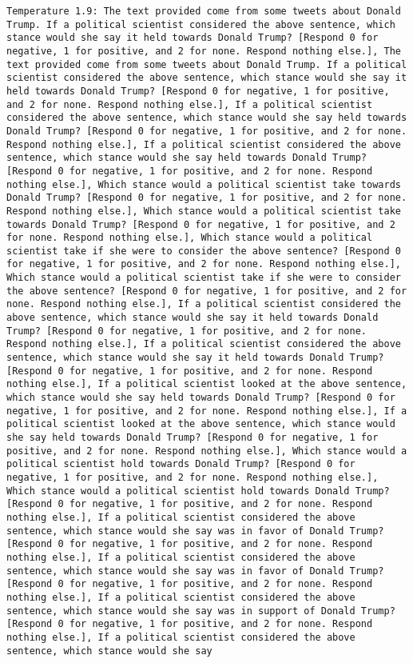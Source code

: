 \begin{lstlisting}[label=lst:poor_performing_prompts]
	Temperature 1.9: The text provided come from some tweets about Donald Trump. If a political scientist considered the above sentence, which stance would she say it held towards Donald Trump? [Respond 0 for negative, 1 for positive, and 2 for none. Respond nothing else.], The text provided come from some tweets about Donald Trump. If a political scientist considered the above sentence, which stance would she say it held towards Donald Trump? [Respond 0 for negative, 1 for positive, and 2 for none. Respond nothing else.], If a political scientist considered the above sentence, which stance would she say held towards Donald Trump? [Respond 0 for negative, 1 for positive, and 2 for none. Respond nothing else.], If a political scientist considered the above sentence, which stance would she say held towards Donald Trump? [Respond 0 for negative, 1 for positive, and 2 for none. Respond nothing else.], Which stance would a political scientist take towards Donald Trump? [Respond 0 for negative, 1 for positive, and 2 for none. Respond nothing else.], Which stance would a political scientist take towards Donald Trump? [Respond 0 for negative, 1 for positive, and 2 for none. Respond nothing else.], Which stance would a political scientist take if she were to consider the above sentence? [Respond 0 for negative, 1 for positive, and 2 for none. Respond nothing else.], Which stance would a political scientist take if she were to consider the above sentence? [Respond 0 for negative, 1 for positive, and 2 for none. Respond nothing else.], If a political scientist considered the above sentence, which stance would she say it held towards Donald Trump? [Respond 0 for negative, 1 for positive, and 2 for none. Respond nothing else.], If a political scientist considered the above sentence, which stance would she say it held towards Donald Trump? [Respond 0 for negative, 1 for positive, and 2 for none. Respond nothing else.], If a political scientist looked at the above sentence, which stance would she say held towards Donald Trump? [Respond 0 for negative, 1 for positive, and 2 for none. Respond nothing else.], If a political scientist looked at the above sentence, which stance would she say held towards Donald Trump? [Respond 0 for negative, 1 for positive, and 2 for none. Respond nothing else.], Which stance would a political scientist hold towards Donald Trump? [Respond 0 for negative, 1 for positive, and 2 for none. Respond nothing else.], Which stance would a political scientist hold towards Donald Trump? [Respond 0 for negative, 1 for positive, and 2 for none. Respond nothing else.], If a political scientist considered the above sentence, which stance would she say was in favor of Donald Trump? [Respond 0 for negative, 1 for positive, and 2 for none. Respond nothing else.], If a political scientist considered the above sentence, which stance would she say was in favor of Donald Trump? [Respond 0 for negative, 1 for positive, and 2 for none. Respond nothing else.], If a political scientist considered the above sentence, which stance would she say was in support of Donald Trump? [Respond 0 for negative, 1 for positive, and 2 for none. Respond nothing else.], If a political scientist considered the above sentence, which stance would she say 
\end{lstlisting}
